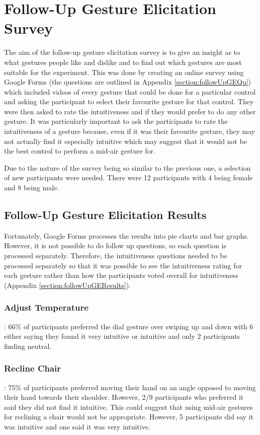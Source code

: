 \documentclass{l4proj}
\begin{document}
\section{Follow-Up Gesture Elicitation Survey}
The aim of the follow-up gesture elicitation survey is to give an insight as to what gestures people like and dislike and to find out which gestures are most suitable for the experiment. This was done by creating an online survey using Google Forms (the questions are outlined in Appendix \ref{section:followUpGEQu}) which included videos of every gesture that could be done for a particular control and asking the participant to select their favourite gesture for that control. They were then asked to rate the intuitiveness and if they would prefer to do any other gesture. It was particularly important to ask the participants to rate the intuitiveness of a gesture because, even if it was their favourite gesture, they may not actually find it especially intuitive which may suggest that it would not be the best control to perform a mid-air gesture for. 

Due to the nature of the survey being so similar to the previous one, a selection of new participants were needed. There were 12 participants with 4 being female and 8 being male.

\subsection{Follow-Up Gesture Elicitation Results}
Fortunately, Google Forms processes the results into pie charts and bar graphs. However, it is not possible to do follow up questions, so each question is processed separately. Therefore, the intuitiveness questions needed to be processed separately so that it was possible to see the intuitiveness rating for each gesture rather than how the participants voted overall for intuitiveness (Appendix \ref{section:followUpGEResults}). 

\subsubsection{Adjust Temperature}: 66\% of participants preferred the dial gesture over swiping up and down with 6 either saying they found it very intuitive or intuitive and only 2 participants finding neutral.
\subsubsection{Recline Chair}: 75\% of participants preferred moving their hand on an angle opposed to moving their hand towards their shoulder. However, 2/9 participants who preferred it said they did not find it intuitive. This could suggest that using mid-air gestures for reclining a chair would not be appropriate. However, 5 participants did say it was intuitive and one said it was very intuitive.
\end{document}
